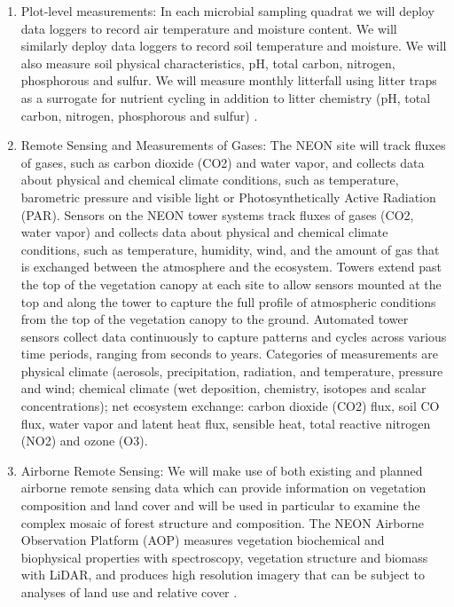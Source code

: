 \documentclass[11pt]{article}
\begin{document}
\begin{enumerate}
\item Plot-level measurements: In each microbial sampling quadrat we
  will deploy data loggers to record air temperature and moisture
  content.  We will similarly deploy data loggers to record soil
  temperature and moisture.  We will also measure soil physical
  characteristics, pH, total carbon, nitrogen, phosphorous and sulfur.
  We will measure monthly litterfall using litter traps as a surrogate
  for nutrient cycling \citep{austin2000, giardina2004} in addition to
  litter chemistry (pH, total carbon, nitrogen, phosphorous and
  sulfur) \citep{NEON}.
\item Remote Sensing and Measurements of Gases: The NEON site will
  track fluxes of gases, such as carbon dioxide (CO2) and water vapor,
  and collects data about physical and chemical climate conditions,
  such as temperature, barometric pressure and visible light or
  Photosynthetically Active Radiation (PAR). Sensors on the NEON tower
  systems track fluxes of gases (CO2, water vapor) and collects data
  about physical and chemical climate conditions, such as temperature,
  humidity, wind, and the amount of gas that is exchanged between the
  atmosphere and the ecosystem. Towers extend past the top of the
  vegetation canopy at each site to allow sensors mounted at the top
  and along the tower to capture the full profile of atmospheric
  conditions from the top of the vegetation canopy to the
  ground. Automated tower sensors collect data continuously to capture
  patterns and cycles across various time periods, ranging from
  seconds to years. Categories of measurements are physical climate
  (aerosols, precipitation, radiation, and temperature, pressure and
  wind; chemical climate (wet deposition, chemistry, isotopes and
  scalar concentrations); net ecosystem exchange: carbon dioxide (CO2)
  flux, soil CO flux, water vapor and latent heat flux, sensible heat,
  total reactive nitrogen (NO2) and ozone (O3).
\item Airborne Remote Sensing: We will make use of both existing and
  planned airborne remote sensing data which can provide information
  on vegetation composition and land cover and will be used in
  particular to examine the complex mosaic of forest structure and
  composition. The NEON Airborne Observation Platform (AOP) measures
  vegetation biochemical and biophysical properties with spectroscopy,
  vegetation structure and biomass with LiDAR, and produces high
  resolution imagery that can be subject to analyses of land use and
  relative cover \citep{NEON}.
\end{enumerate}
\end{document}
